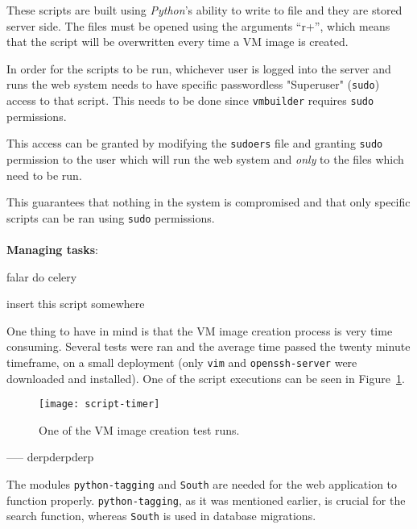 These scripts are built using \textit{Python}'s ability to write to file and they are stored server side. The files must be opened using the arguments ``r+'', which means that the script will be overwritten every time a VM image is created.

In order for the scripts to be run, whichever user is logged into the server and runs the web system needs to have specific passwordless "Superuser" (\texttt{sudo}) access to that script. This needs to be done since \texttt{vmbuilder} requires \texttt{sudo} permissions. 

This access can be granted by modifying the \texttt{sudoers} file and granting \texttt{sudo} permission to the user which will run the web system and \emph{only} to the files which need to be run.

This guarantees that nothing in the system is compromised and that only specific scripts can be ran using \texttt{sudo} permissions.\\
\ \\
\textbf{Managing tasks}:

falar do celery


insert this script somewhere 

One thing to have in mind is that the VM image creation process is very time consuming. Several tests were ran and the average time passed the twenty minute timeframe, on a small deployment (only \texttt{vim} and \texttt{openssh-server} were downloaded and installed). One of the script executions can be seen in Figure~\ref{fig:script-timer}.

\begin{figure}[h]
  \begin{center}
    \leavevmode
    \texttt{[image: script-timer]}
    \caption{One of the VM image creation test runs.}
    \label{fig:script-timer}
  \end{center}
\end{figure}


----- derpderpderp

The modules \texttt{python-tagging} and \texttt{South} are needed for the web application to function properly. \texttt{python-tagging}, as it was mentioned earlier, is crucial for the search function, whereas \texttt{South} is used in database migrations.


\pagebreak












